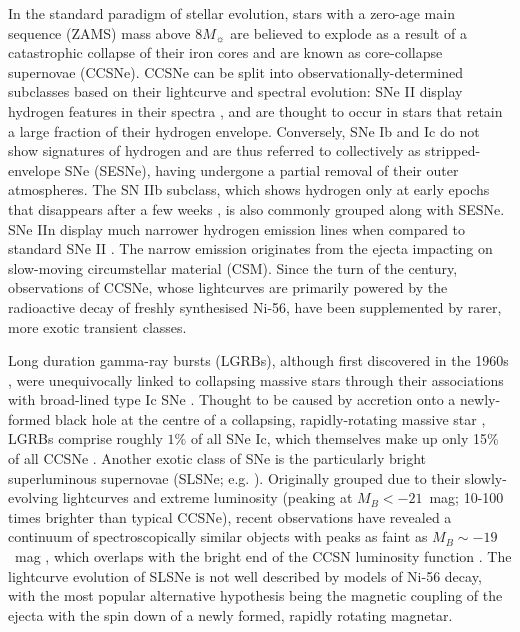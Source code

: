 \documentclass[fleqn,usenatbib,]{mnras}
\begin{document}
In the standard paradigm of stellar evolution, stars with a zero-age main sequence (ZAMS) mass above $8M_{\sun}$ are believed to explode as a result of a catastrophic collapse of their iron cores and are known as core-collapse supernovae (CCSNe). CCSNe can be split into observationally-determined subclasses based on their lightcurve and spectral evolution: SNe II display hydrogen features in their spectra \citep{Minkowski1941}, and are thought to occur in stars that retain a large fraction of their hydrogen envelope. Conversely, SNe Ib and Ic do not show signatures of hydrogen \citep[e.g.][]{Filippenko1997} and are thus referred to collectively as stripped-envelope SNe (SESNe), having undergone a partial removal of their outer atmospheres. The SN IIb subclass, which shows hydrogen only at early epochs that disappears after a few weeks \citep{Filippenko1988}, is also commonly grouped along with SESNe. SNe IIn display much narrower hydrogen emission lines when compared to standard SNe II \citep{Schlegel1990}. The narrow emission originates from the ejecta impacting on slow-moving circumstellar material (CSM). Since the turn of the century, observations of CCSNe, whose lightcurves are primarily powered by the radioactive decay of freshly synthesised Ni-56, have been supplemented by rarer, more exotic transient classes.

 Long duration gamma-ray bursts (LGRBs), although first discovered in the 1960s \citep{Klebesadel1973}, were unequivocally linked to collapsing massive stars through their associations with broad-lined type Ic SNe \citep{Galama1998,Hjorth2003}. Thought to be caused by accretion onto a newly-formed black hole at the centre of a collapsing, rapidly-rotating massive star \citep[e.g.][]{Woosley1993,Woosley2006a,Woosley2006b}, LGRBs comprise roughly $1\%$ of all SNe Ic, which themselves make up only 15\% of all CCSNe \citep{Kelly2012,Graham2016}. Another exotic class of SNe is the particularly bright superluminous supernovae (SLSNe; e.g. \citealt{Quimby2011, Gal-Yam2012}). Originally grouped due to their slowly-evolving lightcurves and extreme luminosity (peaking at $M_B < -21$~mag; 10-100 times brighter than typical CCSNe), recent observations have revealed a continuum of spectroscopically similar objects with peaks as faint as $M_B \sim -19$~mag \citep{DeCia2018,Lunnan2018,Angus2019}, which overlaps with the bright end of the CCSN luminosity function \citep{Li2011}. The lightcurve evolution of SLSNe is not well described by models of Ni-56 decay, with the most popular alternative hypothesis being the magnetic coupling of the ejecta with the spin down of a newly formed, rapidly rotating magnetar.
 
\end{document}
